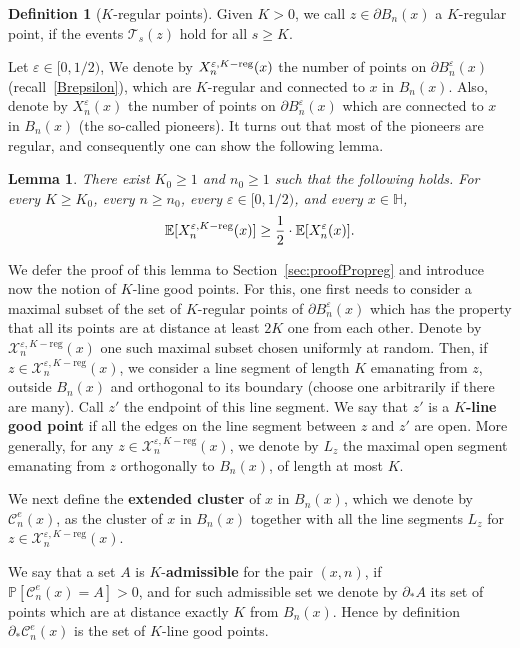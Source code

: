 \documentclass[11pt,a4paper]{article}
\numberwithin{equation}{section}
\theoremstyle{plain}
\newtheorem{Lem}[Thm]{Lemma}
\theoremstyle{definition}
\newtheorem{Def}[Thm]{Definition}
\begin{document}
\begin{Def}[$K$-regular points] Given $K>0$, we call $z\in \partial B_n(x)$ a $K$-regular point, if the events $\mathcal T_s(z)$ hold for all $s\ge K$. 
\end{Def}
Let $\varepsilon \in [0,1/2)$, We denote by $X_n^{\varepsilon,K-\textup{reg}}(x)$ the number of points on $\partial B_n^\varepsilon(x)$ (recall~\eqref{Brepsilon}), which are $K$-regular and connected to $x$ in $B_n(x)$. Also, denote by $X_n^{\varepsilon}(x)$ the number of points on $\partial B_n^\varepsilon(x)$ which are connected to $x$ in $B_n(x)$ (the so-called pioneers). It turns out that most of the pioneers are regular, and consequently one can show the following lemma. 
\begin{Lem}\label{Prop:regpoints}  There exist $K_0\ge 1$ and $n_0\ge 1$ such that the following holds. For every $K\geq K_0$, every $n\ge n_0$, every $\varepsilon\in [0,1/2)$, and every $x\in \mathbb H$,
\begin{equation} 
\mathbb E[X_{n}^{\varepsilon,K-\textup{reg}}(x)] \ge \frac 12 \cdot \mathbb E[X_n^\varepsilon(x)].
\end{equation}
\end{Lem}
We defer the proof of this lemma to Section~\ref{sec:proofPropreg} and introduce now the notion of $K$-line good points.
For this, one first needs to consider a maximal subset of the set of $K$-regular points of $\partial B_n^{\varepsilon}(x)$ which has the property that all its points are  at distance at least $2K$ one from each other. Denote by $\mathcal X_n^{\varepsilon,K-\textrm{reg}}(x)$ one such maximal subset chosen uniformly at random. Then, if $z\in\mathcal X_n^{\varepsilon,K-\textrm{reg}}(x)$, we consider a line segment of length $K$ emanating from $z$, outside $B_n(x)$ and orthogonal to its boundary (choose one arbitrarily if there are many). Call $z'$ the endpoint of this line segment. We say that $z'$ is a \textbf{$K$-line good point} if all the edges on the line segment between $z$ and $z'$ are open. More generally, for any $z\in \mathcal X_n^{\varepsilon,K-\textrm{reg}}(x)$, we denote by $L_z$ the maximal open segment emanating from $z$ orthogonally to $B_n(x)$, of length at most $K$. 


We next define the \textbf{extended cluster} of $x$ in $B_n(x)$, which we denote by $\mathcal C_n^e(x)$, as the cluster of $x$ in $B_n(x)$ together with all the line segments $L_z$ for $z\in \mathcal X_n^{\varepsilon,K-\textrm{reg}}(x)$. 


We say that a set $A$ is $K$-\textbf{admissible} for the pair $(x,n)$, if $\mathbb P[\mathcal C_n^e(x) = A ]>0$, and for such admissible set   
we denote by $\partial_*A$ its set of points which are at distance exactly $K$ from $B_n(x)$. Hence 
by definition $\partial_*\mathcal C_n^e(x)$ is the set of $K$-line good points. 
\end{document}
